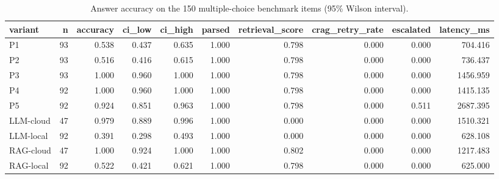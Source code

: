 \begin{table}[htbp]
\centering
\small
\caption{Answer accuracy on the 150 multiple-choice benchmark items (95\% Wilson interval).}
\label{tab:accuracy_by_variant}
\begin{tabular}{l r r r r r r r r r}
\toprule
variant & n & accuracy & ci\_low & ci\_high & parsed & retrieval\_score & crag\_retry\_rate & escalated & latency\_ms \\
\midrule
P1 & 93 & 0.538 & 0.437 & 0.635 & 1.000 & 0.798 & 0.000 & 0.000 & 704.416 \\
P2 & 93 & 0.516 & 0.416 & 0.615 & 1.000 & 0.798 & 0.000 & 0.000 & 736.437 \\
P3 & 93 & 1.000 & 0.960 & 1.000 & 1.000 & 0.798 & 0.000 & 0.000 & 1456.959 \\
P4 & 92 & 1.000 & 0.960 & 1.000 & 1.000 & 0.798 & 0.000 & 0.000 & 1415.135 \\
P5 & 92 & 0.924 & 0.851 & 0.963 & 1.000 & 0.798 & 0.000 & 0.511 & 2687.395 \\
LLM-cloud & 47 & 0.979 & 0.889 & 0.996 & 1.000 & 0.000 & 0.000 & 0.000 & 1510.321 \\
LLM-local & 92 & 0.391 & 0.298 & 0.493 & 1.000 & 0.000 & 0.000 & 0.000 & 628.108 \\
RAG-cloud & 47 & 1.000 & 0.924 & 1.000 & 1.000 & 0.802 & 0.000 & 0.000 & 1217.483 \\
RAG-local & 92 & 0.522 & 0.421 & 0.621 & 1.000 & 0.798 & 0.000 & 0.000 & 625.000 \\
\bottomrule
\end{tabular}
\end{table}
